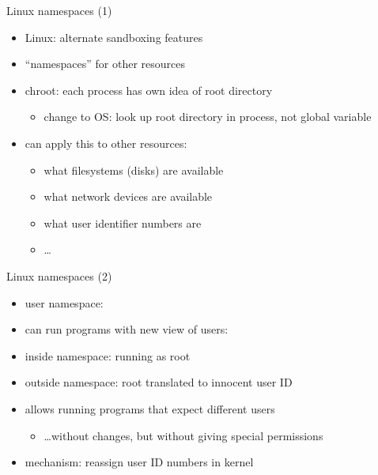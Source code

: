 \begin{frame}{Linux namespaces (1)}
    \begin{itemize}
    \item Linux: alternate sandboxing features
    \item ``namespaces'' for other resources
    \item chroot: each process has own idea of root directory
        \begin{itemize}
        \item change to OS: look up root directory in process, not global variable
        \end{itemize}
    \item can apply this to other resources:
        \begin{itemize}
        \item what filesystems (disks) are available
        \item what network devices are available
        \item what user identifier numbers are
        \item \ldots
        \end{itemize}
    \end{itemize}
\end{frame}

\begin{frame}{Linux namespaces (2)}
    \begin{itemize}
    \item user namespace:
    \vspace{.5cm}
    \item can run programs with new view of users:
    \vspace{.5cm}
    \item inside namespace: running as root
    \item outside namespace: root translated to innocent user ID
    \item allows running programs that expect different users
        \begin{itemize}
        \item \ldots without changes, but without giving special permissions
        \end{itemize}
    \vspace{.5cm}
    \item mechanism: reassign user ID numbers in kernel
    \end{itemize}
\end{frame}

